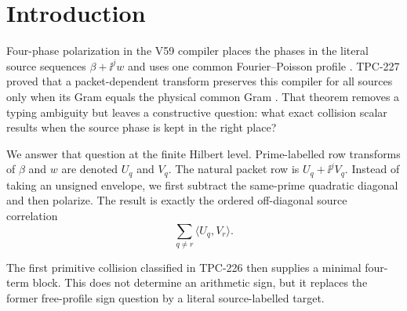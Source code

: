 \section{Introduction}

Four-phase polarization in the V59 compiler places the phases in the literal source
sequences $\beta+\ii^jw$ and uses one common Fourier--Poisson profile
\cite{tpc59}.  TPC-227 proved that a packet-dependent transform preserves this compiler
for all sources only when its Gram equals the physical common Gram \cite{tpc227}.
That theorem removes a typing ambiguity but leaves a constructive question: what exact
collision scalar results when the source phase is kept in the right place?

We answer that question at the finite Hilbert level.  Prime-labelled row transforms of
$\beta$ and $w$ are denoted $U_q$ and $V_q$.  The natural packet row is
$U_q+\ii^jV_q$.  Instead of taking an unsigned envelope, we first subtract the
same-prime quadratic diagonal and then polarize.  The result is exactly the ordered
off-diagonal source correlation
\[
 \sum_{q\ne r}\langle U_q,V_r\rangle.
\]

The first primitive collision classified in TPC-226 \cite{tpc226} then supplies a
minimal four-term block.  This does not determine an arithmetic sign, but it replaces
the former free-profile sign question by a literal source-labelled target.
